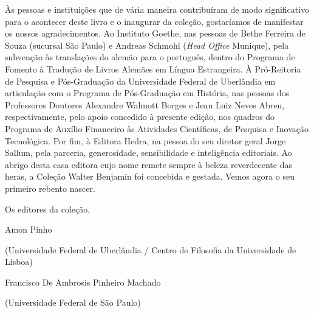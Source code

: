 Às pessoas e instituições que de vária maneira contribuíram de modo
significativo para o acontecer deste livro e o inaugurar da coleção,
gostaríamos de manifestar os nossos agradecimentos. Ao Instituto Goethe,
nas pessoas de Bethe Ferreira de Souza (sucursal São Paulo) e Andreas
Schmohl (\emph{Head Office} Munique), pela subvenção às translações do
alemão para o português, dentro do Programa de Fomento à Tradução de
Livros Alemães em Língua Estrangeira. À Pró-Reitoria de Pesquisa e
Pós-Graduação da Universidade Federal de Uberlândia em articulação com o
Programa de Pós-Graduação em História, nas pessoas dos Professores
Doutores Alexandre Walmott Borges e Jean Luiz Neves Abreu,
respectivamente, pelo apoio concedido à presente edição, nos quadros do
Programa de Auxílio Financeiro às Atividades Científicas, de Pesquisa e
Inovação Tecnológica. Por fim, à Editora Hedra, na pessoa do seu diretor
geral Jorge Sallum, pela parceria, generosidade, sensibilidade e
inteligência editoriais. Ao abrigo desta casa editora cujo nome remete
sempre à beleza reverdecente das heras, a Coleção Walter Benjamin foi
concebida e gestada. Vemos agora o seu primeiro rebento nascer.

Os editores da coleção,

Amon Pinho

(Universidade Federal de Uberlândia / Centro de Filosofia da
Universidade de Lisboa)

Francisco De Ambrosis Pinheiro Machado

(Universidade Federal de São Paulo)
